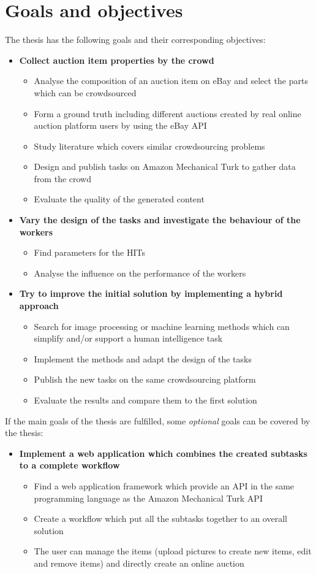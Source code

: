 \documentclass[a4paper]{report}
\begin{document}
\section{Goals and objectives}
The thesis has the following goals and their corresponding objectives:
\begin{itemize}
	\item \textbf{Collect auction item properties by the crowd}
	\begin{itemize}
		\item Analyse the composition of an auction item on eBay and select the parts which can be crowdsourced
		\item Form a ground truth including different auctions created by real online auction platform users by using the eBay API
		\item Study literature which covers similar crowdsourcing problems
		\item Design and publish tasks on Amazon Mechanical Turk to gather data from the crowd
		\item Evaluate the quality of the generated content
	\end{itemize}
	\item \textbf{Vary the design of the tasks and investigate the behaviour of the workers}
	\begin{itemize}
		\item Find parameters for the HITs
		\item Analyse the influence on the performance of the workers
	\end{itemize}
	\item \textbf{Try to improve the initial solution by implementing a hybrid approach}
	\begin{itemize}
		\item Search for image processing or machine learning methods which can simplify and/or support a human intelligence task
		\item Implement the methods and adapt the design of the tasks
		\item Publish the new tasks on the same crowdsourcing platform
		\item Evaluate the results and compare them to the first solution 
	\end{itemize}
\end{itemize}

If the main goals of the thesis are fulfilled, some \textit{optional} goals can be covered by the thesis:
\begin{itemize}
	\item \textbf{Implement a web application which combines the created subtasks to a complete workflow}
	\begin{itemize}
		\item Find a web application framework which provide an API in the same programming language as the Amazon Mechanical Turk API
		\item Create a workflow which put all the subtasks together to an overall solution
		\item The user can manage the items (upload pictures to create new items, edit and remove items) and directly create an online auction
	\end{itemize}
\end{itemize}
\end{document}
